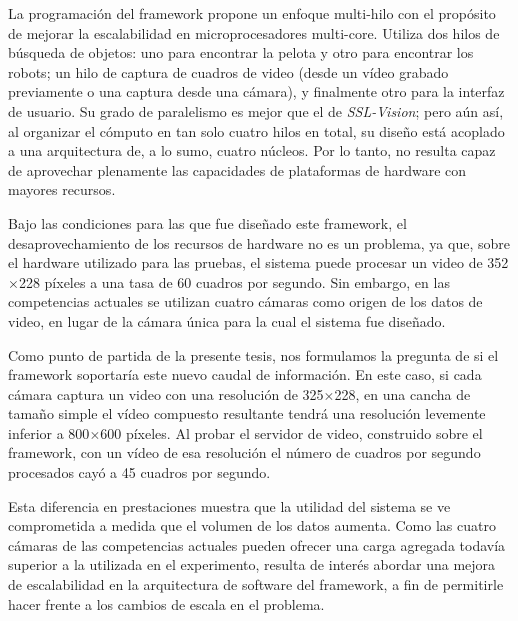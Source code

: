 La programación del framework propone un enfoque multi-hilo con el propósito de
mejorar la escalabilidad en microprocesadores multi-core. Utiliza dos hilos de
búsqueda de objetos: uno para encontrar la pelota y otro para encontrar los
robots; un hilo de captura de cuadros de video (desde un vídeo grabado
previamente o una captura desde una cámara), y finalmente otro para la interfaz
de usuario. Su grado de paralelismo es mejor que el de \emph{SSL-Vision}; pero
aún así, al organizar el cómputo en tan solo cuatro hilos en total, su diseño
está acoplado a una arquitectura de, a lo sumo, cuatro núcleos. Por lo tanto, no
resulta capaz de aprovechar plenamente las capacidades de plataformas de
hardware con mayores recursos.

Bajo las condiciones para las que fue diseñado este framework, el
desaprovechamiento de los recursos de hardware no es un problema, ya que, sobre
el hardware utilizado para las pruebas, el sistema puede procesar un video de
352$\times$228 píxeles a una tasa de 60 cuadros por segundo. Sin embargo, en las
competencias actuales se utilizan cuatro cámaras como origen de los datos de
video, en lugar de la cámara única para la cual el sistema fue diseñado.

Como punto de partida de la presente tesis, nos formulamos la pregunta de si el
framework soportaría este nuevo caudal de información. En este caso, si cada
cámara captura un video con una resolución de 325$\times$228, en una cancha de
tamaño simple el vídeo compuesto resultante tendrá una resolución levemente
inferior a 800$\times$600 píxeles.  Al probar el servidor de video, construido
sobre el framework, con un vídeo de esa resolución el número de cuadros por
segundo procesados cayó a 45 cuadros por segundo.

Esta diferencia en prestaciones muestra que la utilidad del sistema se ve
comprometida a medida que el volumen de los datos aumenta. Como las cuatro
cámaras de las competencias actuales pueden ofrecer una carga agregada todavía
superior a la utilizada en el experimento, resulta de interés abordar una mejora
de escalabilidad en la arquitectura de software del framework, a fin de
permitirle hacer frente a los cambios de escala en el problema.
